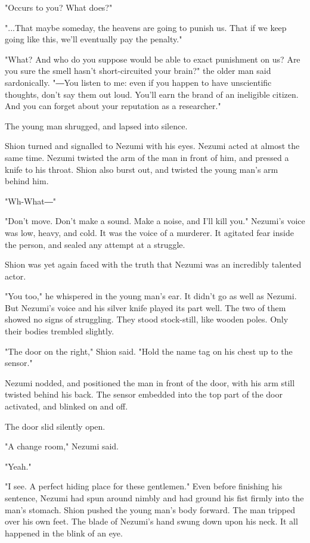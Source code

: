 "Occurs to you? What does?"

"...That maybe someday, the heavens are going to punish us. That if we
keep going like this, we'll eventually pay the penalty."

"What? And who do you suppose would be able to exact punishment on us?
Are you sure the smell hasn't short-circuited your brain?" the older man
said sardonically. "―You listen to me: even if you happen to have
unscientific thoughts, don't say them out loud. You'll earn the brand of
an ineligible citizen. And you can forget about your reputation as a
researcher."

The young man shrugged, and lapsed into silence.

Shion turned and signalled to Nezumi with his eyes. Nezumi acted at
almost the same time. Nezumi twisted the arm of the man in front of him,
and pressed a knife to his throat. Shion also burst out, and twisted the
young man's arm behind him.

"Wh-What―"

"Don't move. Don't make a sound. Make a noise, and I'll kill you."
Nezumi's voice was low, heavy, and cold. It was the voice of a murderer.
It agitated fear inside the person, and sealed any attempt at a
struggle.

Shion was yet again faced with the truth that Nezumi was an incredibly
talented actor.

"You too," he whispered in the young man's ear. It didn't go as well as
Nezumi. But Nezumi's voice and his silver knife played its part well.
The two of them showed no signs of struggling. They stood stock-still,
like wooden poles. Only their bodies trembled slightly.

"The door on the right," Shion said. "Hold the name tag on his chest up
to the sensor."

Nezumi nodded, and positioned the man in front of the door, with his arm
still twisted behind his back. The sensor embedded into the top part of
the door activated, and blinked on and off.

The door slid silently open.

"A change room," Nezumi said.

"Yeah."

"I see. A perfect hiding place for these gentlemen." Even before
finishing his sentence, Nezumi had spun around nimbly and had ground his
fist firmly into the man's stomach. Shion pushed the young man's body
forward. The man tripped over his own feet. The blade of Nezumi's hand
swung down upon his neck. It all happened in the blink of an eye.

